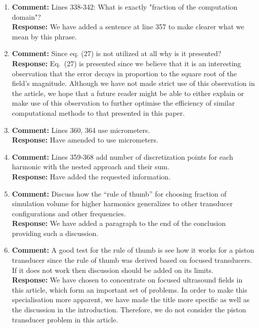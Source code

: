 \documentclass[11pt]{article}
\begin{document}
\begin{enumerate}
	\item \textbf{Comment:} Lines 338-342: What is exactly "fraction of the computation domain"? \\
	\textbf{Response:} We have added a sentence at line 357 to make clearer what we mean by this phrase.

	\item \textbf{Comment:} Since eq. (27) is not utilized at all why is it presented? \\
	\textbf{Response:} Eq.~(27) is presented since we believe that it is an interesting observation that the error decays in proportion to the 
	square root of the field's magnitude. Although we have not made strict use of this observation in the article,
	we hope that a future reader might be able to either explain or make use of this observation to further optimise the efficiency of similar computational methods
	to that presented in this paper. 

	\item \textbf{Comment:} Lines 360, 364 use micrometers. \\
	\textbf{Response:} Have amended to use micrometers.
	
	\item \textbf{Comment:} Lines 359-368 add number of discretization points for each harmonic with the nested approach and their sum. \\
	\textbf{Response:} Have added the requested information.

	\item \textbf{Comment:} Discuss how the ``rule of thumb'' for choosing fraction of simulation volume for higher harmonics generalizes to other transducer configurations and other frequencies. \\
	\textbf{Response:} We have added a paragraph to the end of the conclusion providing such a discussion.
	
	\item \textbf{Comment:} A good test for the rule of thumb is see how it works for a piston transducer since the 
	rule of thumb was derived based on focused transducers. 
	If it does not work then discussion should be added on its limits.\\
	\textbf{Response:} We have chosen to concentrate on focused ultrasound fields in 
	this article, which form an important set of problems. In order to make this specialisation 
	more apparent, we have made the title more specific as well as the discussion in 
	the introduction. Therefore, we do not consider the piston transducer problem in 
	this article.
	

\end{enumerate}
\end{document}
